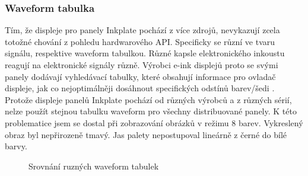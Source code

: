 \subsubsection{Waveform tabulka} Tím, že displeje pro panely Inkplate pochází z více zdrojů, nevykazují zcela totožné chování z pohledu hardwarového API. Specificky se různí ve tvaru signálu, respektive waveform tabulkou. Různé kapsle elektronického inkoustu reagují na elektronické signály různě. Výrobci e-ink displejů proto se svými panely dodávají vyhledávací tabulky, které obsahují informace pro ovladač displeje, jak co nejoptimálněji dosáhnout specifických odstínů barev/šedi \cite{WaveformsTableIntroduction}. Protože displeje panelů Inkplate pochází od různých výrobců a z různých sérií, nelze použít stejnou tabulku waveform pro všechny distribuované panely. K této problematice jsem se dostal při zobrazování obrázků v režimu 8 barev. Vykreslený obraz byl nepřirozeně tmavý. Jas palety nepostupoval lineárně z černé do bílé barvy.

\begin{figure}[h]
    \centering
    \caption{Srovnání ruzných waveform tabulek}
	\label{fig:waveform-comparison}
\end{figure}

